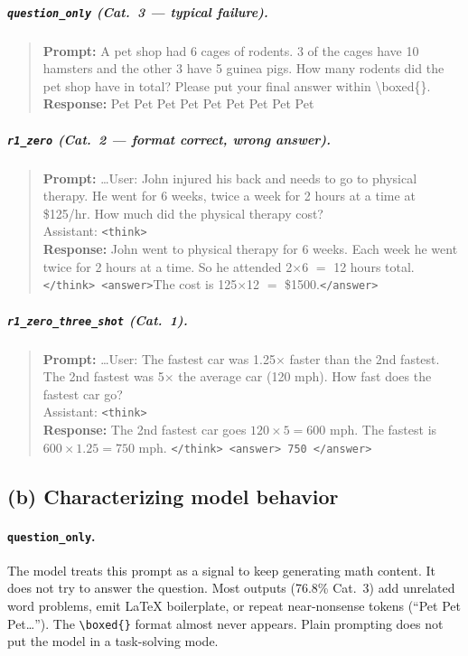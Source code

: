 \documentclass[11pt]{article}
\begin{document}
\subparagraph{\texttt{question\_only} (Cat.~3 --- typical failure).}
\begin{quote}\small
\textbf{Prompt:} A pet shop had 6 cages of rodents. 3 of the cages have 10
hamsters and the other 3 have 5 guinea pigs. How many rodents did the pet shop
have in total? Please put your final answer within \textbackslash boxed\{\}.\\[4pt]
\textbf{Response:} Pet Pet Pet Pet Pet Pet Pet Pet Pet
\end{quote}

\subparagraph{\texttt{r1\_zero} (Cat.~2 --- format correct, wrong answer).}
\begin{quote}\small
\textbf{Prompt:} \ldots User: John injured his back and needs to go to physical
therapy. He went for 6 weeks, twice a week for 2 hours at a time at \$125/hr.
How much did the physical therapy cost?\\
Assistant: \texttt{<think>}\\[4pt]
\textbf{Response:} John went to physical therapy for 6 weeks. Each week he went
twice for 2 hours at a time. So he attended 2$\times$6 $=$ 12 hours total.
\texttt{</think> <answer>}The cost is 125$\times$12 $=$ \$1500.\texttt{</answer>}
\end{quote}

\subparagraph{\texttt{r1\_zero\_three\_shot} (Cat.~1).}
\begin{quote}\small
\textbf{Prompt:} \ldots User: The fastest car was 1.25$\times$ faster than the
2nd fastest. The 2nd fastest was 5$\times$ the average car (120 mph). How fast
does the fastest car go?\\
Assistant: \texttt{<think>}\\[4pt]
\textbf{Response:} The 2nd fastest car goes $120\times5=600$ mph. The fastest
is $600\times1.25=750$ mph.
\texttt{</think> <answer> 750 </answer>}
\end{quote}

\subsection*{(b) Characterizing model behavior}

\paragraph{\texttt{question\_only}.}
The model treats this prompt as a signal to keep generating math content. It
does not try to answer the question. Most outputs (76.8\% Cat.~3) add unrelated
word problems, emit LaTeX boilerplate, or repeat near-nonsense tokens
(``Pet Pet Pet\ldots''). The \verb|\boxed{}| format almost never appears.
Plain prompting does not put the model in a task-solving mode.
\end{document}
